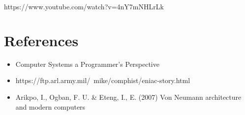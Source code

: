 https://www.youtube.com/watch?v=4nY7mNHLrLk

\section{References}

\begin{itemize}
	\item Computer Systems a Programmer's Perspective
	\item https://ftp.arl.army.mil/~mike/comphist/eniac-story.html
	\item Arikpo, I., Ogban, F. U. \& Eteng, I., E. (2007) Von Neumann architecture and modern computers
\end{itemize}